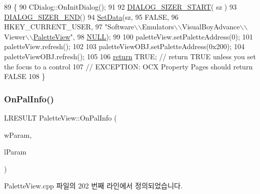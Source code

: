 \begin{DoxyCode}
89 \{
90   CDialog::OnInitDialog();
91   
92   \mbox{\hyperlink{_resize_dlg_8h_acb9d1d22d9838f6dda8a61cfa132997c}{DIALOG\_SIZER\_START}}( sz )
93     \mbox{\hyperlink{_resize_dlg_8h_aeac0c1e32f30e0763df5736e4b3ea50a}{DIALOG\_SIZER\_END}}()
94     \mbox{\hyperlink{class_resize_dlg_a6a3965f44a0c2f5ba9aaa798a9a81df5}{SetData}}(sz,
95             FALSE,
96             HKEY\_CURRENT\_USER,
97             "Software\(\backslash\)\(\backslash\)Emulators\(\backslash\)\(\backslash\)VisualBoyAdvance\(\backslash\)\(\backslash\)Viewer\(\backslash\)\(\backslash\)\mbox{\hyperlink{class_palette_view}{PaletteView}}",
98             \mbox{\hyperlink{getopt1_8c_a070d2ce7b6bb7e5c05602aa8c308d0c4}{NULL}});
99   
100   paletteView.setPaletteAddress(0);
101   paletteView.refresh();  
102   
103   paletteViewOBJ.setPaletteAddress(0x200);
104   paletteViewOBJ.refresh();  
105   
106   \mbox{\hyperlink{gb_codes_8h_a9717e7bbecb906637e86cef6da3d83c2}{return}} TRUE;  \textcolor{comment}{// return TRUE unless you set the focus to a control}
107                 \textcolor{comment}{// EXCEPTION: OCX Property Pages should return FALSE}
108 \}
\end{DoxyCode}
\mbox{\label{class_palette_view_a458786a4c3317411b5cd818c544ea50a}} 
\subsubsection{\texorpdfstring{On\+Pal\+Info()}{OnPalInfo()}}
{\footnotesize\ttfamily L\+R\+E\+S\+U\+LT Palette\+View\+::\+On\+Pal\+Info (\begin{DoxyParamCaption}\item[{W\+P\+A\+R\+AM}]{w\+Param,  }\item[{L\+P\+A\+R\+AM}]{l\+Param }\end{DoxyParamCaption})}



Palette\+View.\+cpp 파일의 202 번째 라인에서 정의되었습니다.


